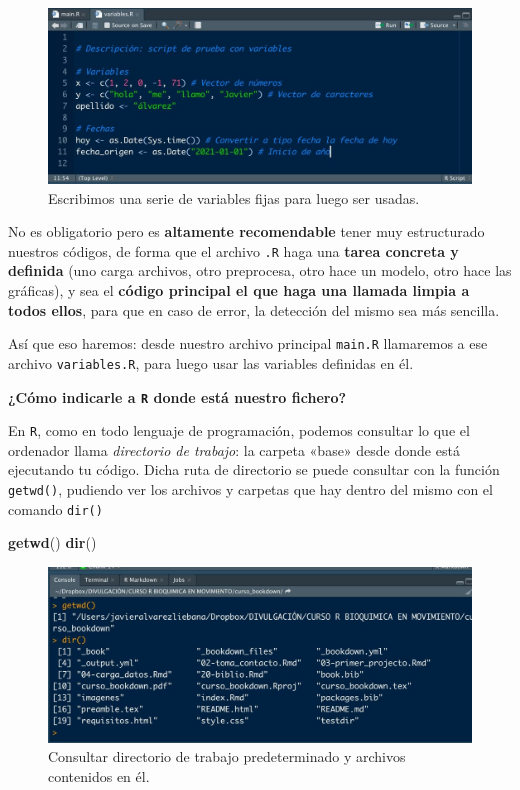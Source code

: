 \documentclass[11pt,]{book}
\newenvironment{Shaded}{\begin{snugshade}}{\end{snugshade}}
\newcommand{\KeywordTok}[1]{\textcolor[rgb]{0.27,0.27,0.27}{\textbf{#1}}}
\newcommand{\NormalTok}[1]{#1}
\begin{document}
\begin{figure}

{\centering \includegraphics[width=0.5\linewidth]{./img/carpeta_codigos2} 

}

\caption{Escribimos una serie de variables fijas para luego ser usadas.}\label{fig:carpeta-codigos2}
\end{figure}

No es obligatorio pero es \textbf{altamente recomendable} tener muy estructurado nuestros códigos, de forma que el archivo \texttt{.R} haga una \textbf{tarea concreta y definida} (uno carga archivos, otro preprocesa, otro hace un modelo, otro hace las gráficas), y sea el \textbf{código principal el que haga una llamada limpia a todos ellos}, para que en caso de error, la detección del mismo sea más sencilla.

Así que eso haremos: desde nuestro archivo principal \texttt{main.R} llamaremos a ese archivo \texttt{variables.R}, para luego usar las variables definidas en él.

\textbf{¿Cómo indicarle a \texttt{R} donde está nuestro fichero?}

En \texttt{R}, como en todo lenguaje de programación, podemos consultar lo que el ordenador llama \emph{directorio de trabajo}: la carpeta «base» desde donde está ejecutando tu código. Dicha ruta de directorio se puede consultar con la función \texttt{getwd()}, pudiendo ver los archivos y carpetas que hay dentro del mismo con el comando \texttt{dir()}

\begin{Shaded}
\begin{Highlighting}[]
\KeywordTok{getwd}\NormalTok{()}
\KeywordTok{dir}\NormalTok{()}
\end{Highlighting}
\end{Shaded}

\begin{figure}

{\centering \includegraphics[width=0.5\linewidth]{./img/getwd} 

}

\caption{Consultar directorio de trabajo predeterminado y archivos contenidos en él.}\label{fig:getwd}
\end{figure}
\end{document}
